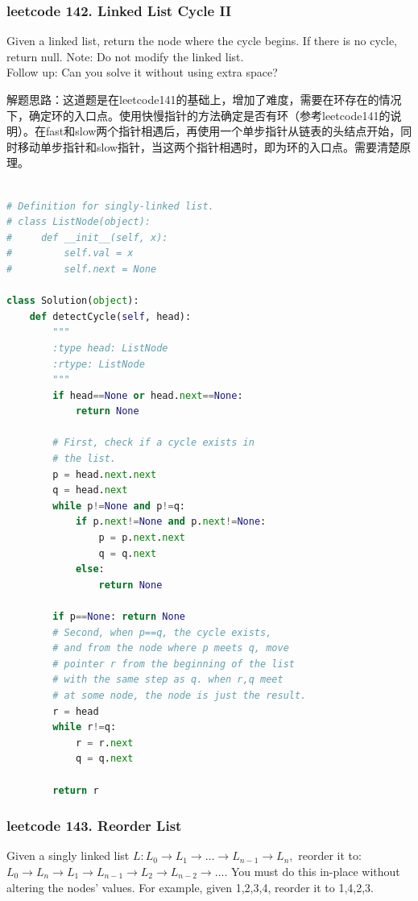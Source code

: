 \documentclass[a4paper,10pt]{article}
\begin{document}
\subsubsection{leetcode 142. Linked List Cycle II}
Given a linked list, return the node where the cycle begins. If there is no cycle, return null. Note: Do not modify the linked list. \\

\noindent Follow up: Can you solve it without using extra space? \\

\begin{CJK*}{UTF8}{gbsn}
\noindent 解题思路：这道题是在leetcode141的基础上，增加了难度，需要在环存在的情况下，确定环的入口点。使用快慢指针的方法确定是否有环（参考leetcode141的说明）。在fast和slow两个指针相遇后，再使用一个单步指针从链表的头结点开始，同时移动单步指针和slow指针，当这两个指针相遇时，即为环的入口点。需要清楚原理。\\
\end{CJK*}

\begin{lstlisting}[language=Python, caption=Problem142. Linked List Cycle II]

# Definition for singly-linked list.
# class ListNode(object):
#     def __init__(self, x):
#         self.val = x
#         self.next = None

class Solution(object):
    def detectCycle(self, head):
        """
        :type head: ListNode
        :rtype: ListNode
        """
        if head==None or head.next==None:
            return None
        
        # First, check if a cycle exists in
        # the list.
        p = head.next.next
        q = head.next
        while p!=None and p!=q:
            if p.next!=None and p.next!=None:
                p = p.next.next
                q = q.next
            else:
                return None
        
        if p==None: return None
        # Second, when p==q, the cycle exists,
        # and from the node where p meets q, move
        # pointer r from the beginning of the list
        # with the same step as q. when r,q meet 
        # at some node, the node is just the result.
        r = head
        while r!=q:
            r = r.next
            q = q.next
        
        return r
\end{lstlisting}



\subsubsection{leetcode 143. Reorder List}
Given a singly linked list $L: L_0\to L_1\to \dots \to L_{n-1} \to L_n,$
reorder it to: $L_0 \to L_n \to L_1 \to L_{n-1} \to L_2 \to L_{n-2} \to \dots$. You must do this in-place without altering the nodes' values. For example, given {1,2,3,4}, reorder it to {1,4,2,3}. \\
\end{document}
